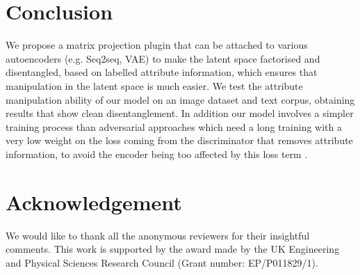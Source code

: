 \documentclass{article}
\begin{document}
\section{Conclusion}
We propose a matrix projection plugin that can be attached to various autoencoders (e.g. Seq2seq, VAE) to make the latent space factorised and  disentangled, based on  labelled attribute information, which ensures that manipulation in the latent space is much easier. 
We test the attribute manipulation ability of our model on an image dataset and text corpus, obtaining results that show clean disentanglement. 
In addition our model involves a simpler training process than adversarial approaches which need a long training with a very low weight on the loss coming from the discriminator that removes attribute information, to avoid the encoder being too affected by this loss term \cite{NIPS2017_7178}.


\section*{Acknowledgement}
We would like to thank all the anonymous reviewers for their insightful comments. This work is supported by the award made by the
UK Engineering and Physical Sciences Research
Council (Grant number: EP/P011829/1).




\end{document}
